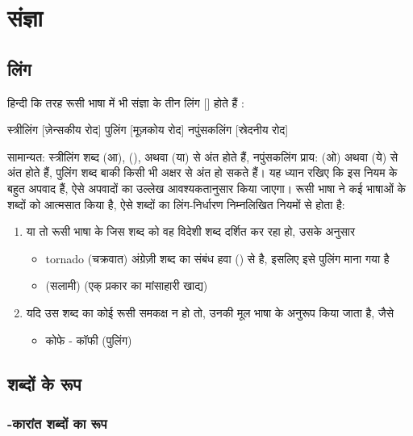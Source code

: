 \chapter{संज्ञा}\label{ch: noun}


\section{लिंग}\label{sec:noun-gender}
हिन्दी कि तरह रूसी भाषा में भी संज्ञा के तीन लिंग []  होते हैं :

स्त्रीलिंग   [ज़ेन्सकीय रोद]
पुलिंग  [मूज़कोय रोद]
नपुंसकलिंग  [स्रेदनीय रोद]

सामान्यत: स्त्रीलिंग शब्द  (आ),  (),  अथवा  (या)  से अंत होते हैं, नपुंसकलिंग प्राय:  (ओ) अथवा
 (ये) से अंत होते हैं, पुलिंग शब्द बाकी किसी भी अक्षर से अंत हो सकते हैं। यह ध्यान रखिए कि इस नियम के बहुत अपवाद हैं, ऐसे अपवादों का उल्लेख
आवश्यकतानुसार किया जाएगा। रूसी भाषा ने कई भाषाओं के शब्दों को आत्मसात किया है, ऐसे शब्दों का लिंग-निर्धारण निम्नलिखित नियमों से होता है:
\begin{enumerate}
    \item या तो रूसी भाषा के जिस शब्द को वह विदेशी शब्द दर्शित कर रहा हो, उसके अनुसार
    \begin{itemize}
        \item tornado (चक्रवात) अंग्रेज़ी शब्द का संबंध हवा () से है, इसलिए इसे पुलिंग माना गया है
        \item (सलामी) (एक् प्रकार का मांसाहारी खाद्य)
    \end{itemize}
    \item  यदि उस शब्द का कोई रूसी समकक्ष न हो तो, उनकी मूल भाषा के अनुरूप किया जाता है, जैसे
    \begin{itemize}
        \item कोफे - कॉफी (पुलिंग)
    \end{itemize}
\end{enumerate}


\section{शब्दों के रूप}\label{sec:noun-endings}

\subsection{-कारांत शब्दों का रूप}\label{subsec:noun-endings-hard}
